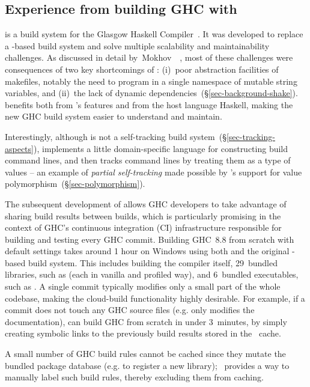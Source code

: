 \subsection{Experience from building GHC with \Shake}

\Hadrian is a build system for the Glasgow Haskell Compiler~\cite{ghc}. It was
developed to replace a \Make-based build system and solve multiple scalability
and maintainability challenges. As discussed in detail
by~Mokhov~\etal~, most of these challenges were consequences
of two key shortcomings of \Make: (i)~poor abstraction facilities of makefiles,
notably the need to program in a single namespace of mutable string variables, and
(ii)~the lack of dynamic dependencies~(\S\ref{sec-background-shake}).
\Hadrian benefits both from \Shake's features and from the host language
Haskell, making the new GHC build system easier to understand and maintain.

Interestingly, although \Shake is not a self-tracking build
system~(\S\ref{sec-tracking-aspects}), \Hadrian implements a little
domain-specific language for constructing build command lines, and then tracks
command lines by treating them as a type of values -- an example of
\emph{partial self-tracking} made possible by \Shake's support for value
polymorphism~(\S\ref{sec-polymorphism}).

The subsequent development of \Cloud \Shake allows GHC developers to take advantage of
sharing build results between builds, which is particularly promising in the
context of GHC's continuous integration (CI) infrastructure responsible for
building and testing every GHC commit. Building GHC~8.8 from scratch with
default settings takes around 1 hour on Windows using both \Hadrian and the
original \Make-based build system. This includes building the compiler itself,
29~bundled libraries, such as  (each in vanilla and profiled way), and
6~bundled executables, such as . A single commit typically modifies
only a small part of the whole codebase, making the cloud-build functionality
highly desirable. For example, if a commit does not touch any GHC source files
(e.g. only modifies the documentation), \Hadrian can build GHC from scratch in under
3~minutes, by simply creating symbolic links to the previously build results
stored in the \Cloud~\Shake cache.

A small number of GHC build rules
cannot be cached since they mutate the bundled package database (e.g. to
register a new library); \Cloud~\Shake provides a way to manually label such
build rules, thereby excluding them from caching.

